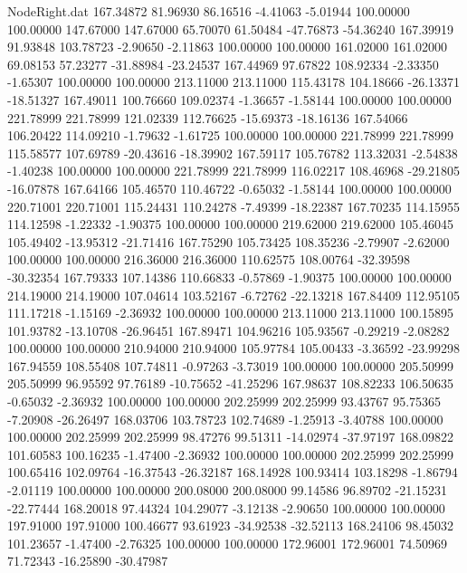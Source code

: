 \begin{filecontents}{NodeRight.dat}
 167.34872   81.96930   86.16516    -4.41063   -5.01944  100.00000  100.00000  147.67000  147.67000   65.70070   61.50484  -47.76873  -54.36240
 167.39919   91.93848  103.78723    -2.90650   -2.11863  100.00000  100.00000  161.02000  161.02000   69.08153   57.23277  -31.88984  -23.24537
 167.44969   97.67822  108.92334    -2.33350   -1.65307  100.00000  100.00000  213.11000  213.11000  115.43178  104.18666  -26.13371  -18.51327
 167.49011  100.76660  109.02374    -1.36657   -1.58144  100.00000  100.00000  221.78999  221.78999  121.02339  112.76625  -15.69373  -18.16136
 167.54066  106.20422  114.09210    -1.79632   -1.61725  100.00000  100.00000  221.78999  221.78999  115.58577  107.69789  -20.43616  -18.39902
 167.59117  105.76782  113.32031    -2.54838   -1.40238  100.00000  100.00000  221.78999  221.78999  116.02217  108.46968  -29.21805  -16.07878
 167.64166  105.46570  110.46722    -0.65032   -1.58144  100.00000  100.00000  220.71001  220.71001  115.24431  110.24278   -7.49399  -18.22387
 167.70235  114.15955  114.12598    -1.22332   -1.90375  100.00000  100.00000  219.62000  219.62000  105.46045  105.49402  -13.95312  -21.71416
 167.75290  105.73425  108.35236    -2.79907   -2.62000  100.00000  100.00000  216.36000  216.36000  110.62575  108.00764  -32.39598  -30.32354
 167.79333  107.14386  110.66833    -0.57869   -1.90375  100.00000  100.00000  214.19000  214.19000  107.04614  103.52167   -6.72762  -22.13218
 167.84409  112.95105  111.17218    -1.15169   -2.36932  100.00000  100.00000  213.11000  213.11000  100.15895  101.93782  -13.10708  -26.96451
 167.89471  104.96216  105.93567    -0.29219   -2.08282  100.00000  100.00000  210.94000  210.94000  105.97784  105.00433   -3.36592  -23.99298
 167.94559  108.55408  107.74811    -0.97263   -3.73019  100.00000  100.00000  205.50999  205.50999   96.95592   97.76189  -10.75652  -41.25296
 167.98637  108.82233  106.50635    -0.65032   -2.36932  100.00000  100.00000  202.25999  202.25999   93.43767   95.75365   -7.20908  -26.26497
 168.03706  103.78723  102.74689    -1.25913   -3.40788  100.00000  100.00000  202.25999  202.25999   98.47276   99.51311  -14.02974  -37.97197
 168.09822  101.60583  100.16235    -1.47400   -2.36932  100.00000  100.00000  202.25999  202.25999  100.65416  102.09764  -16.37543  -26.32187
 168.14928  100.93414  103.18298    -1.86794   -2.01119  100.00000  100.00000  200.08000  200.08000   99.14586   96.89702  -21.15231  -22.77444
 168.20018   97.44324  104.29077    -3.12138   -2.90650  100.00000  100.00000  197.91000  197.91000  100.46677   93.61923  -34.92538  -32.52113
 168.24106   98.45032  101.23657    -1.47400   -2.76325  100.00000  100.00000  172.96001  172.96001   74.50969   71.72343  -16.25890  -30.47987

\end{filecontents}
